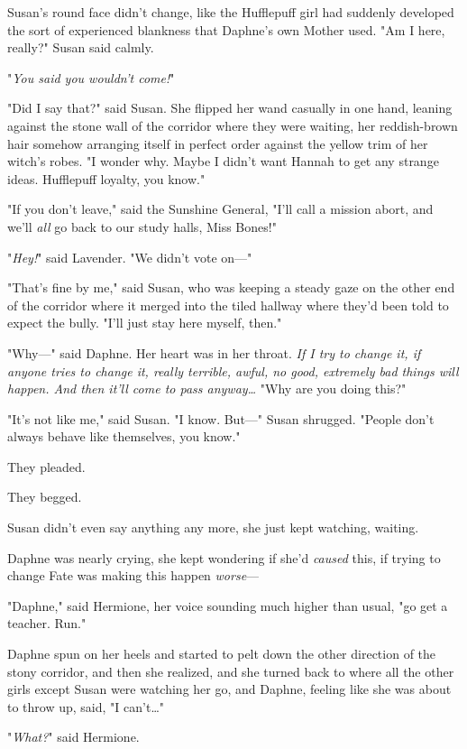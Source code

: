 Susan's round face didn't change, like the Hufflepuff girl had suddenly
developed the sort of experienced blankness that Daphne's own Mother used. "Am
I here, really?" Susan said calmly.

"\emph{You said you wouldn't come!}"

"Did I say that?" said Susan. She flipped her wand casually in one hand,
leaning against the stone wall of the corridor where they were waiting, her
reddish-brown hair somehow arranging itself in perfect order against the yellow
trim of her witch's robes. "I wonder why. Maybe I didn't want Hannah to get any
strange ideas. Hufflepuff loyalty, you know."

"If you don't leave," said the Sunshine General, "I'll call a mission abort,
and we'll \emph{all} go back to our study halls, Miss Bones!"

"\emph{Hey!}" said Lavender. "We didn't vote on---"

"That's fine by me," said Susan, who was keeping a steady gaze on the other end
of the corridor where it merged into the tiled hallway where they'd been told
to expect the bully. "I'll just stay here myself, then."

"Why---" said Daphne. Her heart was in her throat. \emph{If I try to change it,
if \emph{anyone} tries to change it, really terrible, awful, no good, extremely
bad things will happen. And then it'll come to pass anyway{\ldots}} "Why are
you doing this?"

"It's not like me," said Susan. "I know. But---" Susan shrugged. "People don't
always behave like themselves, you know."

They pleaded.

They begged.

Susan didn't even say anything any more, she just kept watching, waiting.

Daphne was nearly crying, she kept wondering if she'd \emph{caused} this, if
trying to change Fate was making this happen \emph{worse}---

"Daphne," said Hermione, her voice sounding much higher than usual, "go get a
teacher. Run."

Daphne spun on her heels and started to pelt down the other direction of the
stony corridor, and then she realized, and she turned back to where all the
other girls except Susan were watching her go, and Daphne, feeling like she was
about to throw up, said, "I can't{\ldots}"

"\emph{What?}" said Hermione.

